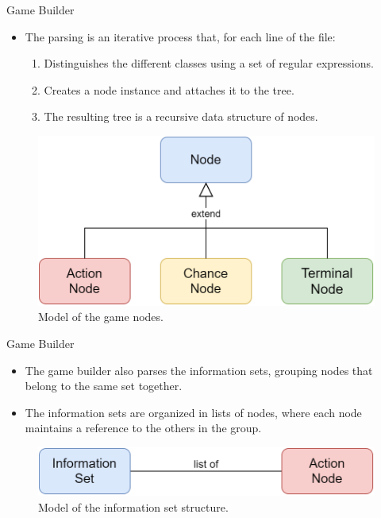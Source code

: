 \documentclass[11pt]{beamer}
\begin{document}
\begin{frame}{Game Builder}
\begin{itemize}
\item The parsing is an iterative process that, for each line of the file:
\begin{enumerate}
\item Distinguishes the different classes using a set of regular expressions.
\item Creates a node instance and attaches it to the tree.
\item The resulting tree is a recursive data structure of nodes.
\end{enumerate}
\end{itemize}
\begin{figure}[hbtp]
		\centering
		\includegraphics[scale=0.2]{images/img_02.png}
		\caption{Model of the game nodes.}
\end{figure}
\end{frame}

\begin{frame}{Game Builder}
\begin{itemize}
\item The game builder also parses the information sets, grouping nodes that belong to the same set together.
\item The information sets are organized in lists of nodes, where each node maintains a reference to the others in the group.
\end{itemize}
\begin{figure}[hbtp]
		\centering
		\includegraphics[scale=0.25]{images/img_03.png}
		\caption{Model of the information set structure.}
\end{figure}
\end{frame}
\end{document}
